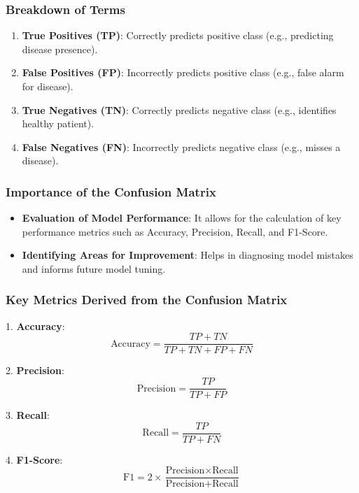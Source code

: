 \documentclass{beamer}
\begin{document}
\begin{frame}[fragile]
    \frametitle{Breakdown of Terms}
    \begin{enumerate}
        \item \textbf{True Positives (TP)}: Correctly predicts positive class (e.g., predicting disease presence).
        \item \textbf{False Positives (FP)}: Incorrectly predicts positive class (e.g., false alarm for disease).
        \item \textbf{True Negatives (TN)}: Correctly predicts negative class (e.g., identifies healthy patient).
        \item \textbf{False Negatives (FN)}: Incorrectly predicts negative class (e.g., misses a disease).
    \end{enumerate}
\end{frame}

\begin{frame}[fragile]
    \frametitle{Importance of the Confusion Matrix}
    \begin{itemize}
        \item \textbf{Evaluation of Model Performance}: It allows for the calculation of key performance metrics such as Accuracy, Precision, Recall, and F1-Score.
        \item \textbf{Identifying Areas for Improvement}: Helps in diagnosing model mistakes and informs future model tuning.
    \end{itemize}
\end{frame}

\begin{frame}[fragile]
    \frametitle{Key Metrics Derived from the Confusion Matrix}
    1. \textbf{Accuracy}:
    \begin{equation}
    \text{Accuracy} = \frac{TP + TN}{TP + TN + FP + FN}
    \end{equation}
    
    2. \textbf{Precision}:
    \begin{equation}
    \text{Precision} = \frac{TP}{TP + FP}
    \end{equation}
    
    3. \textbf{Recall}:
    \begin{equation}
    \text{Recall} = \frac{TP}{TP + FN}
    \end{equation}
    
    4. \textbf{F1-Score}:
    \begin{equation}
    \text{F1} = 2 \times \frac{\text{Precision} \times \text{Recall}}{\text{Precision} + \text{Recall}}
    \end{equation}
\end{frame}
\end{document}

